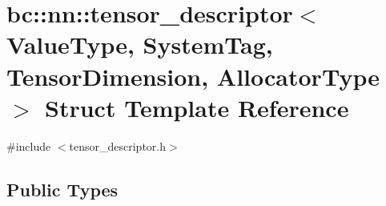 \hypertarget{structbc_1_1nn_1_1tensor__descriptor}{}\section{bc\+:\+:nn\+:\+:tensor\+\_\+descriptor$<$ Value\+Type, System\+Tag, Tensor\+Dimension, Allocator\+Type $>$ Struct Template Reference}
\label{structbc_1_1nn_1_1tensor__descriptor}


{\ttfamily \#include $<$tensor\+\_\+descriptor.\+h$>$}

\subsection*{Public Types}
